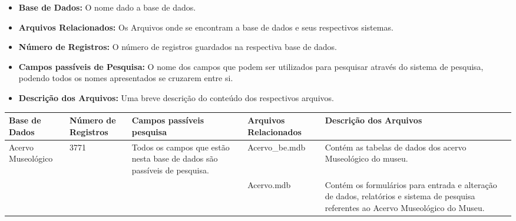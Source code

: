 \begin{itemize}
	\item \textbf{Base de Dados:} O nome dado a base de dados.
	\item \textbf{Arquivos Relacionados:} Os Arquivos onde se encontram a base de dados e seus respectivos sistemas.
	\item \textbf{Número de Registros:} O número de registros guardados na respectiva base de dados.
	\item \textbf{Campos passíveis de Pesquisa:} O nome dos campos que podem ser utilizados para pesquisar através do sistema de pesquisa, podendo todos os nomes apresentados se cruzarem entre si.
	\item \textbf{Descrição dos Arquivos:} Uma breve descrição do conteúdo dos respectivos arquivos.
\end{itemize}

\begin{center}
	\begin{tabular}{|p{2cm} | p{2.3cm} | p{3.7cm} | p{3cm} | p{3.5cm} |} 
		\hline
		\textbf{Base de Dados} & \textbf{Número de Registros} & \textbf{Campos passíveis pesquisa} & \textbf{Arquivos Relacionados} & \textbf{Descrição dos Arquivos}\\
		\hline\hline
		Acervo Museológico & 3771 & Todos os campos que estão nesta base de dados são passíveis de pesquisa. & Acervo\_be.mdb & Contém as tabelas de dados dos acervo Museológico do museu.\\ 
		\hline
		&  &  & Acervo.mdb & Contém os formulários para entrada e alteração de dados, relatórios e sistema de pesquisa referentes ao Acervo Museológico do Museu.\\
		\hline
	\end{tabular}
\end{center}


